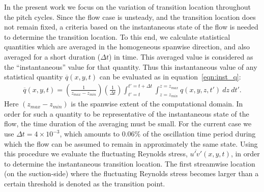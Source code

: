 In the present work we focus on the variation of transition location throughout the pitch cycles. Since the flow case is unsteady, and the transition location does not remain fixed, a criteria based on the instantaneous state of the flow is needed to determine the transition location. To this end, we calculate statistical quantities which are averaged in the homogeneous spanwise direction, and also averaged for a short duration ($\Delta t$) in time. This averaged value is considered as the ``instantaneous'' value for that quantity. Thus this instantaneous value of any statistical quantity $\overline{q}(x,y,t)$ can be evaluated as in equation~\ref{eqn:inst_q}:
\begin{align}
	\overline{q}(x,y,t) = \left(\frac{1}{z_{max}-z_{min}}\right)\left(\frac{1}{\Delta t}\right)\int_{t'=t}^{t'=t+\Delta t}\int_{z=z_{min}}^{z=z_{max}}q(x,y,z,t')\ dz\ dt'.
	\label{eqn:inst_q}
\end{align}
Here $(z_{max}-z_{min})$ is the spanwise extent of the computational domain. In order for such a quantity to be representative of the instantaneous state of the flow, the time duration of the averaging must be small. For the current case we use $\Delta t=4\times10^{-3}$, which amounts to $0.06\%$ of the oscillation time period during which the flow can be assumed to remain in approximately the same state. Using this procedure we evaluate the fluctuating Reynolds stress, $\overline{u'v'}(x,y,t)$, in order to determine the instantaneous transition location. The first streamwise location (on the suction-side) where the fluctuating Reynolds stress becomes larger than a certain threshold is denoted as the transition point. 
